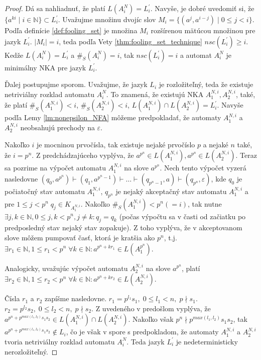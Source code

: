 \begin{proof}
Dá sa nahliadnuť, že platí $ L(A_i^N) = L^{\prime}_i $. Navyše, je dobré uvedomiť si, že $ \lbrace a^{ki} \; | \; i \in \mathbb{N} \rbrace \subset L^{\prime}_i $. Uvažujme množinu dvojíc slov $ M_i = \lbrace (a^j,a^{i-j}) \; | \; 0 \leq j < i  \rbrace $. Podľa definície \ref{def:fooling_set} je množina $ M_i $ rozšírenou mätúcou množinou pre jazyk $ L^{\prime}_i $. $ |M_i|=i $, teda podľa Vety \ref{thm:fooling_set_technique} $ nsc(L^{\prime}_i) \geq i $. Kedže $ L(A_i^N) = L^{\prime}_i $ a $ \#_S(A_i^N) = i $, tak $nsc(L^{\prime}_i) = i $ a automat $ A_i^N $ je minimálny NKA pre jazyk $ L^{\prime}_i $.
\par
Ďalej postupujme sporom. Uvažujme, že jazyk $ L_{i} $ je rozložiteľný, teda že existuje netriviálny rozklad automatu $ A_i^N $. To znamená, že existujú NKA $ A_1^{N,i}, A_2^{N,i} $, také, že platí $ \#_S(A_1^{N,i}) < i $, $ \#_S(A_2^{N,i}) < i $, $ L(A_1^{N,i}) \cap L(A_2^{N,i}) = L^{\prime}_i $. Navyše podľa Lemy \ref{lm:nonepsilon_NFA} môžeme predpokladať, že automaty $ A_1^{N,i}$ a $ A_2^{N,i} $ neobsahujú prechody na $ \varepsilon $. 
\par
Nakoľko $ i $ je mocninou prvočísla, tak existuje nejaké prvočíslo $ p $ a nejaké $ n $ také, že $ i=p^n $. Z predchádzajúceho vyplýva, že $ a^{p^n} \in L(A_1^{N,i}), a^{p^n} \in L(A_2^{N,i})$. Teraz sa pozrime na výpočet automatu $ A_1^{N,i} $ na slove $ a^{p^n} $. Nech tento výpočet vyzerá nasledovne $ (q_0,a^{p^n}) \vdash (q_1,a^{p^n-1}) \vdash \dots \vdash (q_{p^n-1},a) \vdash (q_{p^n},\varepsilon) $, kde $ q_0 $ je počiatočný stav automatu $ A_1^{N,i} $, $ q_{p^n} $ je nejaký akceptačný stav automatu $ A_1^{N,i} $ a pre $ 1 \leq j < p^n \; q_j \in K_{A_1^{N,i}}$. Nakoľko $ \#_S(A_1^{N,i}) < p^n(=i) $, tak nutne $ \exists j,k \in \mathbb{N}, 0 \leq j,k < p^n, j \neq k: q_j = q_k $ (počas výpočtu sa v časti \glqq{}od začiatku po predposledný stav\grqq{} nejaký stav zopakuje). Z toho vyplýva, že v akceptovanom slove môžem pumpovať časť, ktorá je kratšia ako $ p^n $, t.j. $ \exists r_1 \in \mathbb{N}, 1 \leq r_1 < p^n \; \forall k \in \mathbb{N}: a^{p^n+kr_1} \in L(A_1^{p^n})$. 
\par
Analogicky, uvažujúc výpočet automatu $ A_2^{N,i} $ na slove $ a^{p^n} $, platí $ \exists r_2 \in \mathbb{N}, 1 \leq r_2 < p^n \; \forall k \in \mathbb{N}: a^{p^n+kr_2} \in L(A_2^{N,i})$.
\par
Čísla $ r_1 $ a $ r_2 $ zapíšme nasledovne. $ r_1 = p^{l_1}s_1, \; 0 \leq l_1 < n, \; p \nmid s_1 $. $ r_2 = p^{l_2}s_2, \; 0 \leq l_2 < n, \; p \nmid s_2 $. Z uvedeného v predošlom vyplýva, že $ a^{p^n + p^{max(l_1,l_2)}s_1s_2} \in L(A_1^{N,i}) \cap L(A_2^{N,i}) $. Nakoľko však $ p^n \nmid p^{max(l_1,l_2)}s_1s_2$, tak $ a^{p^n + p^{max(l_1,l_2)}s_1s_2} \notin L_{i} $, čo je však v spore s predpokladom, že automaty $ A_1^{N,i} $ a $ A_2^{N,i} $ tvoria netriviálny rozklad automatu $ A_{i}^N $. Teda jazyk $ L^{\prime}_i $ je nedeterministicky nerozložiteľný.

\end{proof}
